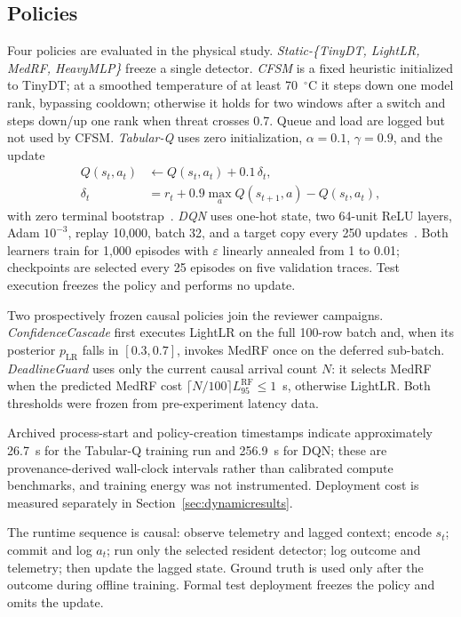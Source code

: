\subsection{Policies}
Four policies are evaluated in the physical study. \emph{Static-\{TinyDT, LightLR, MedRF, HeavyMLP\}} freeze a single detector. \emph{CFSM} is a fixed heuristic initialized to TinyDT; at a smoothed temperature of at least 70~$^{\circ}$C it steps down one model rank, bypassing cooldown; otherwise it holds for two windows after a switch and steps down/up one rank when threat crosses 0.7. Queue and load are logged but not used by CFSM. \emph{Tabular-Q} uses zero initialization, $\alpha=0.1$, $\gamma=0.9$, and the update
\begin{equation}
    \begin{aligned}
        Q(s_t,a_t) &\leftarrow Q(s_t,a_t) + 0.1\,\delta_t,\\
        \delta_t &= r_t + 0.9\max_a Q(s_{t+1},a) - Q(s_t,a_t),
    \end{aligned}
\end{equation}
with zero terminal bootstrap~\cite{Watkins1992}. \emph{DQN} uses one-hot state, two 64-unit ReLU layers, Adam $10^{-3}$, replay 10{,}000, batch 32, and a target copy every 250 updates~\cite{Mnih2015}. Both learners train for 1{,}000 episodes with $\varepsilon$ linearly annealed from 1 to 0.01; checkpoints are selected every 25 episodes on five validation traces. Test execution freezes the policy and performs no update.

Two prospectively frozen causal policies join the reviewer campaigns. \emph{ConfidenceCascade} first executes LightLR on the full 100-row batch and, when its posterior $p_{\text{LR}}$ falls in $[0.3,0.7]$, invokes MedRF once on the deferred sub-batch. \emph{DeadlineGuard} uses only the current causal arrival count $N$: it selects MedRF when the predicted MedRF cost $\lceil N/100\rceil L_{95}^{\text{RF}}\le 1$~s, otherwise LightLR. Both thresholds were frozen from pre-experiment latency data.

Archived process-start and policy-creation timestamps indicate approximately 26.7~s for the Tabular-Q training run and 256.9~s for DQN; these are provenance-derived wall-clock intervals rather than calibrated compute benchmarks, and training energy was not instrumented. Deployment cost is measured separately in Section~\ref{sec:dynamicresults}.

The runtime sequence is causal: observe telemetry and lagged context; encode $s_t$; commit and log $a_t$; run only the selected resident detector; log outcome and telemetry; then update the lagged state. Ground truth is used only after the outcome during offline training. Formal test deployment freezes the policy and omits the update.

